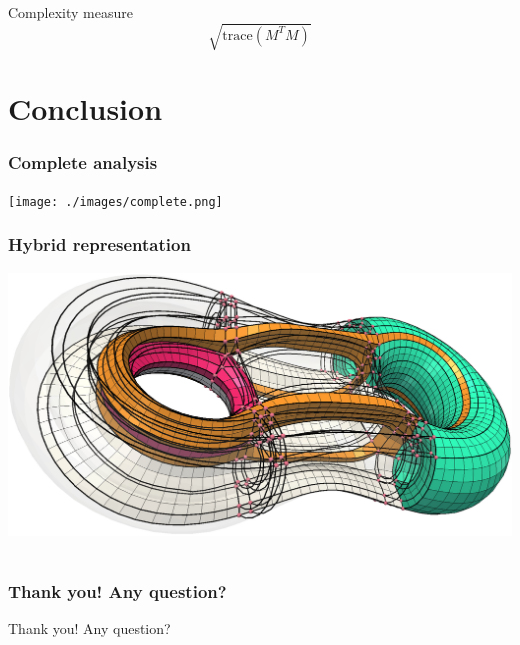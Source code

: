 \documentclass[12pt]{beamer}
\begin{document}
\begin{frame}
\begin{columns}
\begin{column}{0.5\textwidth}
    \end{column}
  \end{columns}
  \begin{block}{Complexity measure}\begin{equation*}
      \sqrt{\text{trace}(M^TM)}
  \end{equation*}\end{block}
\end{frame}

\section{Conclusion}

\begin{frame}
  \frametitle{Complete analysis}
  \texttt{[image: ./images/complete.png]}
\end{frame}

\begin{frame}
  \frametitle{Hybrid representation}
  \includegraphics[width=\textwidth]{./images/hybrid.png}
\end{frame}

\section*{}

\begin{frame}
  \frametitle{Thank you! Any question?}
  \begin{center}
    Thank you! Any question?
  \end{center}
\end{frame}
\end{document}
